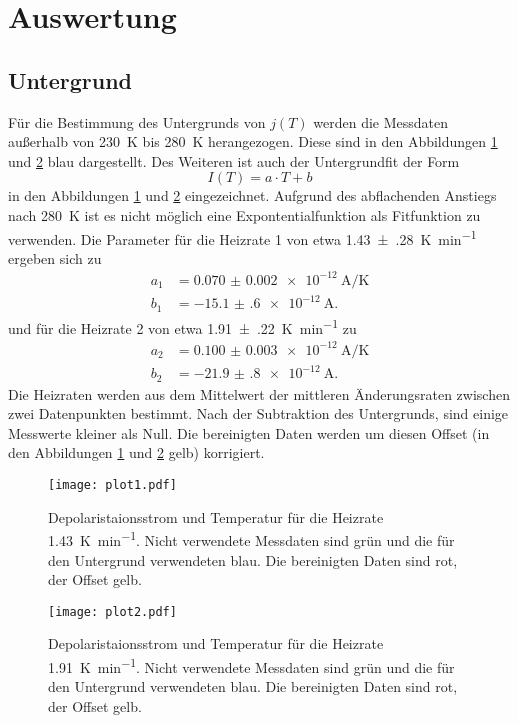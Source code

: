 \section{Auswertung}
\label{sec:Auswertung}

\subsection{Untergrund}
\label{sec:Unter}
Für die Bestimmung des Untergrunds von $j(T)$ werden die Messdaten außerhalb von \SI{230}{\kelvin} bis \SI{280}{\kelvin} herangezogen.
Diese sind in den Abbildungen \ref{fig:plot1} und \ref{fig:plot2} blau dargestellt.
Des Weiteren ist auch der Untergrundfit der Form
\begin{equation}
    \label{eqn:exp}
    I(T) = a \cdot T + b
\end{equation}
in den Abbildungen \ref{fig:plot1} und \ref{fig:plot2} eingezeichnet.
Aufgrund des abflachenden Anstiegs nach \SI{280}{\kelvin} ist es nicht möglich eine Expontentialfunktion als Fitfunktion zu verwenden.
Die Parameter für die Heizrate 1 von etwa \SI{1.43(28)}{\kelvin\per\minute} ergeben sich zu
\begin{align*}
    a_1 &= \SI{0.070(2)e-12}{\ampere\per\kelvin} \\
    b_1 &= \SI{-15.1(6)e-12}{\ampere}.
\end{align*}
und für die Heizrate 2 von etwa \SI{1.91(22)}{\kelvin\per\minute} zu
\begin{align*}
  a_2 &= \SI{0.100(3)e-12}{\ampere\per\kelvin} \\
  b_2 &= \SI{-21.9(8)e-12}{\ampere}.
\end{align*}
Die Heizraten werden aus dem Mittelwert der mittleren Änderungsraten zwischen zwei Datenpunkten bestimmt.
Nach der Subtraktion des Untergrunds, sind einige Messwerte kleiner als Null.
Die bereinigten Daten werden um diesen Offset (in den Abbildungen \ref{fig:plot1} und \ref{fig:plot2} gelb) korrigiert.

\begin{figure}
  \centering
  \texttt{[image: plot1.pdf]}
  \caption{Depolaristaionsstrom und Temperatur für die Heizrate \SI{1.43}{\kelvin\per\minute}. Nicht verwendete Messdaten sind grün und die für den Untergrund verwendeten blau. Die bereinigten Daten sind rot, der Offset gelb.}
  \label{fig:plot1}
\end{figure}
\begin{figure}
  \centering
  \texttt{[image: plot2.pdf]}
  \caption{Depolaristaionsstrom und Temperatur für die Heizrate \SI{1.91}{\kelvin\per\minute}. Nicht verwendete Messdaten sind grün und die für den Untergrund verwendeten blau. Die bereinigten Daten sind rot, der Offset gelb.}
  \label{fig:plot2}
\end{figure}

